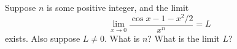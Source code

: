 Suppose $n$ is some positive integer, and the limit
\[
\lim_{x\to0} \frac{\cos x -1 -x^2/2} {x^n} = L
\]
exists. Also suppose $L\neq0$.
What is $n$?  What is the limit $L$?
